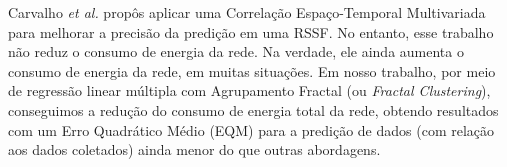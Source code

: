\documentclass{acm_proc_article-sp}
\begin{document}
Carvalho \textit{et al.} \cite{Carvalho2011} propôs aplicar uma Correlação
Espaço-Temporal Multivariada para melhorar a precisão da predição em uma RSSF.
No entanto, esse trabalho não reduz o consumo de energia da rede. Na verdade,
ele ainda aumenta o consumo de energia da rede, em muitas situações. Em nosso
trabalho, por meio de regressão linear múltipla com Agrupamento Fractal (ou {\it
Fractal Clustering}), conseguimos a redução do consumo de energia total da rede,
obtendo resultados com um Erro Quadrático Médio (EQM) para a predição de dados
(com relação aos dados coletados) ainda menor do que outras abordagens.
\vspace*{-.3cm}
\end{document}
